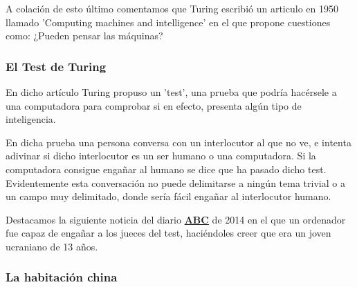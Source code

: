 A colación de esto último comentamos que Turing escribió un articulo en 1950 llamado 'Computing machines and intelligence' en el que propone cuestiones como: ¿Pueden pensar las máquinas?


\subsubsection{El Test de Turing}

En dicho artículo Turing propuso un 'test', una prueba que podría hacérsele a una computadora para comprobar si en efecto, presenta algún tipo de inteligencia.

En dicha prueba una persona conversa con un interlocutor al que no ve, e intenta adivinar si dicho interlocutor es un ser humano o una computadora. Si la computadora consigue engañar al humano se dice que ha pasado dicho test. Evidentemente esta conversación no puede delimitarse a ningún tema trivial o a un campo muy delimitado, donde sería fácil engañar al interlocutor humano.

Destacamos la siguiente noticia del diario \href{https://www.abc.es/ciencia/20140609/abci-superordenador-supera-primera-test-201406091139.html}{\textbf{ABC}} de 2014 en el que un ordenador fue capaz de engañar a los jueces del test, haciéndoles creer que era un joven ucraniano de 13 años.


\subsubsection{La habitación china}

\newpage
	
